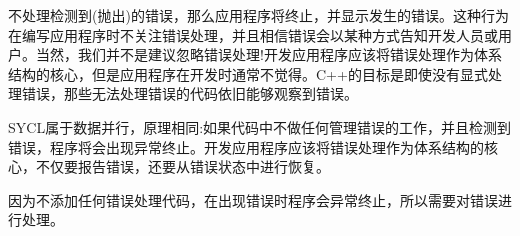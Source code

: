 不处理检测到(抛出)的错误，那么应用程序将终止，并显示发生的错误。这种行为在编写应用程序时不关注错误处理，并且相信错误会以某种方式告知开发人员或用户。当然，我们并不是建议忽略错误处理!开发应用程序应该将错误处理作为体系结构的核心，但是应用程序在开发时通常不觉得。C++的目标是即使没有显式处理错误，那些无法处理错误的代码依旧能够观察到错误。\par

SYCL属于数据并行，原理相同:如果代码中不做任何管理错误的工作，并且检测到错误，程序将会出现异常终止。开发应用程序应该将错误处理作为体系结构的核心，不仅要报告错误，还要从错误状态中进行恢复。\par

\begin{tcolorbox}[colback=red!5!white,colframe=red!75!black]
因为不添加任何错误处理代码，在出现错误时程序会异常终止，所以需要对错误进行处理。
\end{tcolorbox}


























